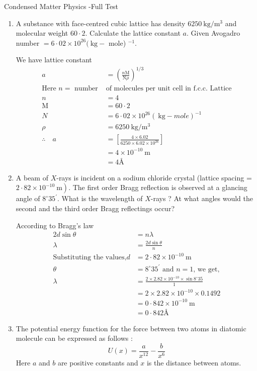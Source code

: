 \begin{abox}
	Condensed Matter Physics -Full Test
	\end{abox}
\begin{enumerate}
	\item A substance with face-centred cubic lattice has density $6250 \mathrm{~kg} / \mathrm{m}^{3}$ and molecular weight ${6 0} \cdot 2$. Calculate the lattice constant $a$. Given Avogadro number $=6 \cdot 02 \times 10^{26}(\mathrm{~kg}-$ mole) ${ }^{-1}$.
	\begin{answer}
		We have lattice constant
		$$\begin{aligned}
		a&=\left(\frac{n \mathrm{M}}{\mathrm{N} \rho}\right)^{1 / 3}\\
		\text{Here $n=$ number  }&\text{of molecules per unit cell in f.c.c. Lattice} \\
		n&=4\\
		 \mathrm{M}&=60 \cdot 2\\
		  N&=6 \cdot 02 \times 10^{26}(\mathrm{~kg}- mole )^{-1}\\
		 \rho&=6250 \mathrm{~kg} / \mathrm{m}^{3}\\
		\therefore \quad a &=\left[\frac{4 \times 6.02}{6250 \times 6.02 \times 10^{26}}\right] \\
		&=4 \times 10^{-10} \mathrm{~m} \\
		&=4 \text{\AA}
		\end{aligned}$$
	\end{answer}
 \item A beam of $X$-rays is incident on a sodium chloride crystal (lattice spacing = $\left.2 \cdot 82 \times 10^{-10} \mathrm{~m}\right)$. The first order Bragg reflection is observed at a glancing angle of $8^{\circ} 35^{\prime}$. What is the wavelength of $X$-rays ? At what angles would the second and the third order Bragg reflectings occur?

\begin{answer}
According to Bragg's law
$$
\begin{aligned}
2 d \sin \theta &=n \lambda \\
\lambda &=\frac{2 d \sin \theta}{n}
\\\text{Substituting the values,} d&=2 \cdot 82 \times 10^{-10} \mathrm{~m}\\
 \theta&=8^{\circ} 35^{\prime} \text{ and $n=1$, we get,}\\
 \lambda &=\frac{2 \times 2.82 \times 10^{-10} \times \sin 8^{\circ} 35}{1} \\
 &=2 \times 2.82 \times 10^{-10} \times 0.1492 \\
 &=0 \cdot 842 \times 10^{-10} \mathrm{~m} \\
 &=0 \cdot 842 \text{\AA}
\end{aligned}
$$
\end{answer}
\item The potential energy function for the force between two atoms in diatomic molecule can be expressed as follows :
$$
U(x)=\frac{a}{x^{12}}-\frac{b}{x^{6}}
$$
Here $a$ and $b$ are positive constants and $x$ is the distance between atoms.


\end{enumerate}
